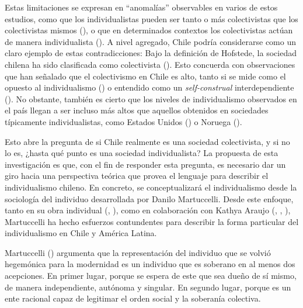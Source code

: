 \documentclass[
  letterpaper,
  DIV=11,
  numbers=noendperiod]{scrartcl}
\begin{document}
Estas limitaciones se expresan en ``anomalías'' observables en varios de
estos estudios, como que los individualistas pueden ser tanto o más
colectivistas que los colectivistas mismos
(), o que
en determinados contextos los colectivistas actúan de manera
individualista (). A
nivel agregado, Chile podría considerarse como un claro ejemplo de estas
contradicciones: Bajo la definición de Hofstede, la sociedad chilena ha
sido clasificada como colectivista
(). Esto concuerda con
observaciones que han señalado que el colectivismo en Chile es alto,
tanto si se mide como el opuesto al individualismo
() o
entendido como un \emph{self-construal} interdependiente
(). No obstante,
también es cierto que los niveles de individualismo observados en el
país llegan a ser incluso más altos que aquellos obtenidos en sociedades
típicamente individualistas, como Estados Unidos
() o
Noruega ().

Esto abre la pregunta de si Chile realmente es una sociedad
colectivista, y si no lo es, ¿hasta qué punto es una sociedad
individualista? La propuesta de esta investigación es que, con el fin de
responder esta pregunta, es necesario dar un giro hacia una perspectiva
teórica que provea el lenguaje para describir el individualismo chileno.
En concreto, se conceptualizará el individualismo desde la sociología
del individuo desarrollada por Danilo Martuccelli. Desde este enfoque,
tanto en su obra individual (, ), como en colaboración con
Kathya Araujo (,
, ),
Martuccelli ha hecho esfuerzos contundentes para describir la forma
particular del individualismo en Chile y América Latina.

Martuccelli () argumenta que la
representación del individuo que se volvió hegemónica para la modernidad
es un individuo que es soberano en al menos dos acepciones. En primer
lugar, porque se espera de este que sea dueño de sí mismo, de manera
independiente, autónoma y singular. En segundo lugar, porque es un ente
racional capaz de legitimar el orden social y la soberanía colectiva.
\end{document}
